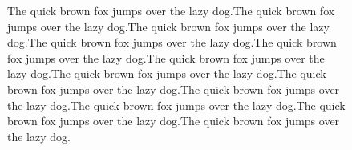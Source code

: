 \Conclusion %

\begin{figure}
The quick brown fox jumps over the lazy dog.The quick brown fox jumps over the lazy dog.The quick brown fox jumps over the lazy dog.The quick brown fox jumps over the lazy dog.The quick brown fox jumps over the lazy dog.The quick brown fox jumps over the lazy dog.The quick brown fox jumps over the lazy dog.The quick brown fox jumps over the lazy dog.The quick brown fox jumps over the lazy dog.The quick brown fox jumps over the lazy dog.The quick brown fox jumps over the lazy dog.The quick brown fox jumps over the lazy dog.
\end{figure}
